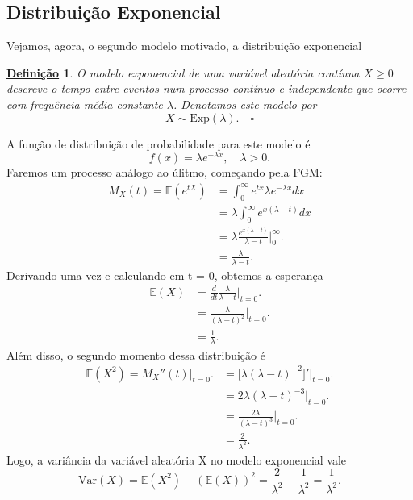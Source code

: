 \documentclass{article}
\newtheorem*{def*}{\underline{Defini\c c\~ao}}
\begin{document}
\subsection{Distribuição Exponencial}
Vejamos, agora, o segundo modelo motivado, a distribuição exponencial
\begin{def*}
  O \textit{modelo exponencial} de uma variável aleatória contínua \(X\geq 0\) descreve
  o tempo entre eventos num processo contínuo e independente que ocorre com frequência média constante
  \(\lambda \). Denotamos este modelo por 
  \[
    X\sim \mathrm{Exp}(\lambda ).\quad\square
  \]
\end{def*}
A função de distribuição de probabilidade para este modelo é 
\[
  f(x) = \lambda e^{-\lambda x},\quad \lambda > 0.
\]
Faremos um processo análogo ao úlitmo, começando pela FGM:
\begin{align*}
  M_{X}(t) = \mathbb{E}(e^{tX}) &= \int_{0}^{\infty}e^{tx}\lambda e^{-\lambda x}dx\\
                                &= \lambda \int_{0}^{\infty}e^{x(\lambda - t)}dx\\
                                &= \lambda \frac{e^{x(\lambda -t)}}{\lambda -t}\biggl|_{0}^{\infty}\biggr.\\
                                &= \frac{\lambda }{\lambda -t}.
\end{align*}
Derivando uma vez e calculando em t = 0, obtemos a esperança 
\begin{align*}
  \mathbb{E}(X) &= \frac{d}{dt}\frac{\lambda }{\lambda -t}\biggl|_{t=0}^{}\biggr.\\
                &= \frac{\lambda }{(\lambda -t)^{2}}\biggl|_{t=0}^{}\biggr.\\
                &= \frac{1}{\lambda }.
\end{align*}
Além disso, o segundo momento dessa distribuição é 
\begin{align*}
  \mathbb{E}(X^{2}) = M_{X}''(t)\biggl|_{t=0}^{}\biggr. &= \biggl[\lambda(\lambda -t)^{-2}\biggr]'\biggl|_{t=0}^{}\biggr.\\
                                                        &= 2\lambda(\lambda -t)^{-3}\biggl|_{t=0}^{}\biggr.\\
                                                        &= \frac{2\lambda }{(\lambda-t)^{3}}\biggl|_{t=0}^{}\biggr.\\
                                                        &= \frac{2}{\lambda^{2}}.
\end{align*}
Logo, a variância da variável aleatória X no modelo exponencial vale 
\[
  \mathrm{Var}(X) = \mathbb{E}(X^{2}) - (\mathbb{E}(X))^{2} = \frac{2}{\lambda^{2}}-\frac{1}{\lambda^{2}} = \frac{1}{\lambda^{2}}.
\]
\end{document}
